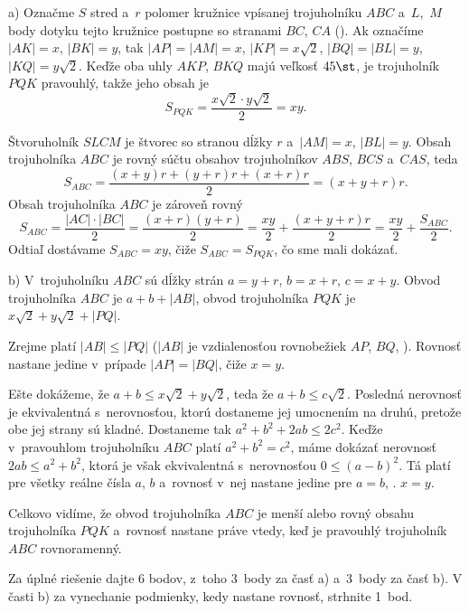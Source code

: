{%
a) Označme $S$ stred a~$r$ polomer kružnice vpísanej trojuholníku $ABC$ a~$L$,~$M$ body dotyku tejto kružnice postupne so stranami $BC$, $CA$ (\obr).
Ak označíme $|AK|=x$, $|BK|=y$, tak $|AP|=|AM|=x$, $|KP|=x\sqrt{2}$,
$|BQ|=|BL|=y$, $|KQ|=y\sqrt{2}$. Keďže oba uhly $AKP$, $BKQ$  majú veľkosť $45\st$,
je trojuholník $PQK$ pravouhlý, takže jeho obsah je
$$
S_{PQK}=\frac{x\sqrt{2} \cdot y\sqrt{2}}{2}=xy.
$$
%

Štvoruholník $SLCM$ je štvorec so stranou dĺžky $r$ a~$|AM|=x$, $|BL|=y$.
Obsah trojuholníka $ABC$ je rovný súčtu obsahov trojuholníkov $ABS$, $BCS$
a~$CAS$, teda
$$
S_{ABC}=\frac{(x+y)r+(y+r)r+(x+r)r}{2}=(x+y+r)r.
$$
Obsah trojuholníka $ABC$ je zároveň rovný
$$
S_{ABC}=\frac{|AC|\cdot
|BC|}{2}=\frac{(x+r)(y+r)}{2}=\frac{xy}{2}+\frac{(x+y+r)r}{2}=\frac{xy}{2}+\frac{S_{ABC}}{2}.
$$
Odtiaľ dostávame $S_{ABC}=xy$, čiže $S_{ABC}=S_{PQK}$, čo sme mali dokázať.

\smallskip
b) V~trojuholníku $ABC$ sú dĺžky strán $a=y+r$, $b=x+r$, $c=x+y$. Obvod
trojuholníka $ABC$ je $a+b+|AB|$, obvod trojuholníka $PQK$ je
$x\sqrt{2}+y\sqrt{2}+|PQ|$.

Zrejme platí $|AB|\le |PQ|$ ($|AB|$ je vzdialenosťou rovnobežiek $AP$, $BQ$, ).
Rovnosť nastane jedine v~prípade $|AP|=|BQ|$, čiže $x=y$.

Ešte dokážeme, že $a+b\le x\sqrt{2}+y\sqrt{2}$, teda že $a+b\le c\sqrt{2}$. Posledná nerovnosť je ekvivalentná s~nerovnosťou, ktorú dostaneme
jej umocnením na druhú, pretože obe jej strany sú kladné. Dostaneme tak
$a^2+b^2+2ab \le 2c^2$. Keďže v~pravouhlom
trojuholníku $ABC$ platí $a^2+b^2=c^2$, máme dokázať nerovnosť $2ab \le a^2+b^2$, ktorá je však ekvivalentná s~nerovnosťou $0 \le (a-b)^2$. Tá
platí pre všetky reálne čísla $a$, $ b$ a~rovnosť v~nej nastane jedine pre
$a=b$, \tj. $x=y$.

Celkovo vidíme, že obvod trojuholníka $ABC$ je menší alebo rovný obsahu
trojuholníka $PQK$ a~rovnosť nastane práve vtedy, keď je pravouhlý trojuholník
$ABC$ rovnoramenný.

\nobreak\medskip\petit\noindent
Za úplné riešenie dajte 6 bodov, z~toho 3~body za časť a) a~3~body za časť b).
V časti b) za vynechanie podmienky, kedy nastane rovnosť, strhnite 1~bod.
\endpetit
\bigbreak
}

